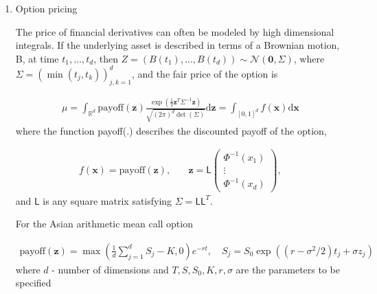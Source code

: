 \documentclass[smallextended]{svjour3}       %
\newcommand{\bm}[1]{\boldsymbol{#1}}
\newcommand{\mSigma}{\Sigma}
\newcommand{\dif}[1]{\text{d}{#1}}
\newcommand{\vx}{\bm{x}}
\newcommand{\dvx}{\dif{\bm{x}}}
\newcommand{\vz}{\bm{z}}
\newcommand{\dvz}{\dif{\bm{z}}}
\newcommand{\vzero}{\bm{0}}
\newcommand{\mL}{\mathsf{L}}
\begin{document}
\begin{enumerate}







\item Option pricing


The price of financial derivatives can often be modeled by high dimensional integrals. If the underlying asset is described in terms of a Brownian motion, B, at time $t_1,...,t_d$, then $Z = (B(t_1), ..., B(t_d)) \sim \mathcal{N}(\vzero,\mSigma)$, where $\mSigma = \left(\min(t_j,t_k) \right)_{j,k=1}^d$, and the fair price of the option is

\begin{align*}
\mu = \int_{\mathbb{R}^d} \text{payoff}(\vz) \frac{\exp(\frac 12 \vz^T\mSigma^{-1}\vz)}{\sqrt{(2\pi)^d \det(\mSigma)}} \dvz = \int_{[0,1]^d} f(\vx) \dvx
\end{align*}
where the function payoff(.) describes the discounted payoff of the option,


\begin{align*}
f(\vx) = \text{payoff}(\vz), & \quad \vz = \mL 
\begin{pmatrix}
\Phi^{-1}(x_1) \\ \vdots \\ \Phi^{-1}(x_d)
\end{pmatrix},
\end{align*}
and $\mL$ is any square matrix satisfying $\mSigma = \mL \mL^T$.

For the Asian arithmetic mean call option

\begin{align*}
\text{payoff}(\vz) = \max\left( \frac 1d  \sum_{j=1}^d S_j - K, 0 \right) e^{-r t}, \quad
S_j = S_0 \exp((r-\sigma^2/2)t_j + \sigma z_j )
\end{align*}
where $d$ - number of dimensions and $T, S, S_0, K, r, \sigma$ are the parameters to be specified


\end{enumerate}
\end{document}

